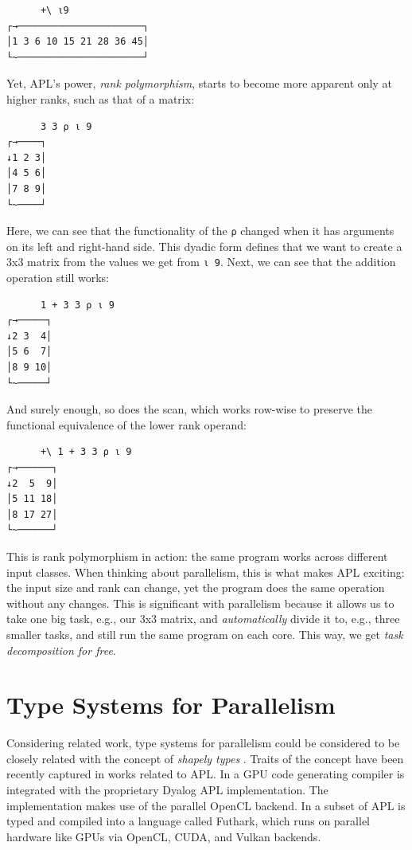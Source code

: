 \documentclass{report}
\begin{document}
\begin{verbatim}
      +\ ⍳9
┌→──────────────────────┐
│1 3 6 10 15 21 28 36 45│
└~──────────────────────┘
\end{verbatim}

Yet, APL's power, \emph{rank polymorphism}, starts to become more apparent only at higher ranks, such as that of a matrix:

\begin{verbatim}
      3 3 ⍴ ⍳ 9
┌→────┐
↓1 2 3│
│4 5 6│
│7 8 9│
└~────┘
\end{verbatim}

Here, we can see that the functionality of the \verb|⍴| changed when it has arguments on its left and right-hand side. This dyadic form defines that we want to create a 3x3 matrix from the values we get from \verb|⍳ 9|. Next, we can see that the addition operation still works:

\begin{verbatim}
      1 + 3 3 ⍴ ⍳ 9
┌→─────┐
↓2 3  4│
│5 6  7│
│8 9 10│
└~─────┘
\end{verbatim}

And surely enough, so does the scan, which works row-wise to preserve the functional equivalence of the lower rank operand:

\begin{verbatim}
      +\ 1 + 3 3 ⍴ ⍳ 9
┌→──────┐
↓2  5  9│
│5 11 18│
│8 17 27│
└~──────┘
\end{verbatim}

This is rank polymorphism in action: the same program works across different input classes. When thinking about parallelism, this is what makes APL exciting: the input size and rank can change, yet the program does the same operation without any changes. This is significant with parallelism because it allows us to take one big task, e.g., our 3x3 matrix, and \emph{automatically} divide it to, e.g., three smaller tasks, and still run the same program on each core. This way, we get \emph{task decomposition for free}.

\section{Type Systems for Parallelism}

Considering related work, type systems for parallelism could be considered to be closely related with the concept of \emph{shapely types} \cite{jay1994shapely, shkaravska2007polynomial}. Traits of the concept have been recently captured in works related to APL. In \cite{hsu2019phd} a GPU code generating compiler is integrated with the proprietary Dyalog APL implementation. The implementation makes use of the parallel OpenCL backend. In \cite{Henriksen:2016:AGT:2975991.2975997} a subset of APL is typed and compiled into a language called Futhark, which runs on parallel hardware like GPUs via OpenCL, CUDA, and Vulkan backends.
\end{document}

